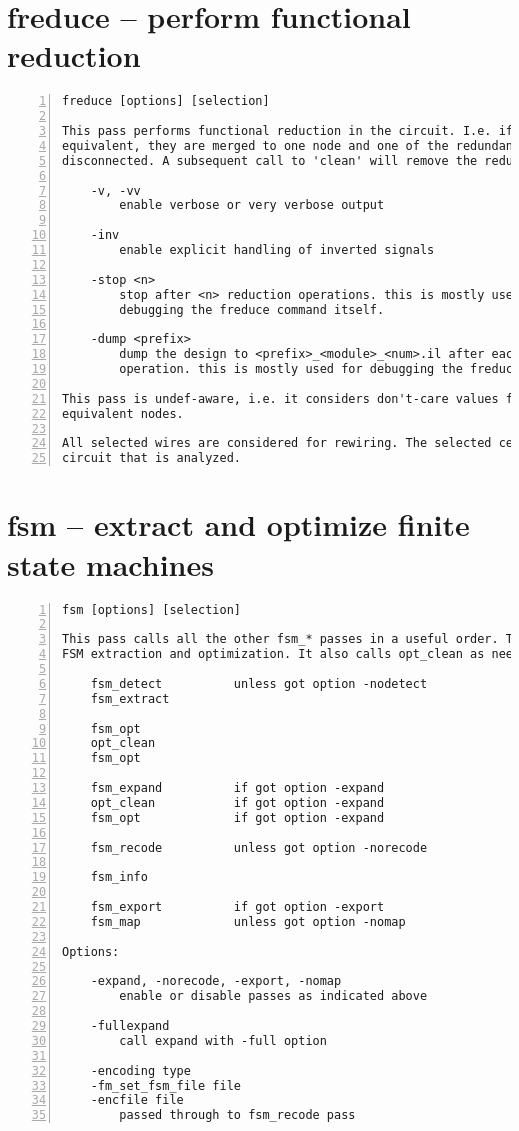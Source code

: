 \section{freduce -- perform functional reduction}
\label{cmd:freduce}
\begin{lstlisting}[numbers=left,frame=single]
    freduce [options] [selection]

This pass performs functional reduction in the circuit. I.e. if two nodes are
equivalent, they are merged to one node and one of the redundant drivers is
disconnected. A subsequent call to 'clean' will remove the redundant drivers.

    -v, -vv
        enable verbose or very verbose output

    -inv
        enable explicit handling of inverted signals

    -stop <n>
        stop after <n> reduction operations. this is mostly used for
        debugging the freduce command itself.

    -dump <prefix>
        dump the design to <prefix>_<module>_<num>.il after each reduction
        operation. this is mostly used for debugging the freduce command.

This pass is undef-aware, i.e. it considers don't-care values for detecting
equivalent nodes.

All selected wires are considered for rewiring. The selected cells cover the
circuit that is analyzed.
\end{lstlisting}

\section{fsm -- extract and optimize finite state machines}
\label{cmd:fsm}
\begin{lstlisting}[numbers=left,frame=single]
    fsm [options] [selection]

This pass calls all the other fsm_* passes in a useful order. This performs
FSM extraction and optimization. It also calls opt_clean as needed:

    fsm_detect          unless got option -nodetect
    fsm_extract

    fsm_opt
    opt_clean
    fsm_opt

    fsm_expand          if got option -expand
    opt_clean           if got option -expand
    fsm_opt             if got option -expand

    fsm_recode          unless got option -norecode

    fsm_info

    fsm_export          if got option -export
    fsm_map             unless got option -nomap

Options:

    -expand, -norecode, -export, -nomap
        enable or disable passes as indicated above

    -fullexpand
        call expand with -full option

    -encoding type
    -fm_set_fsm_file file
    -encfile file
        passed through to fsm_recode pass
\end{lstlisting}

